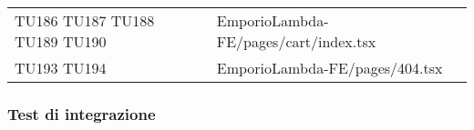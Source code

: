 {\begin{longtable}{C{2cm} C{12.8cm}}
TU186 \newline TU187 \newline TU188 \newline TU189 \newline TU190 & EmporioLambda-FE/pages/cart/index.tsx\\

TU193 \newline TU194 & EmporioLambda-FE/pages/404.tsx\\





\end{longtable}

}

\subsubsection{Test di integrazione}
